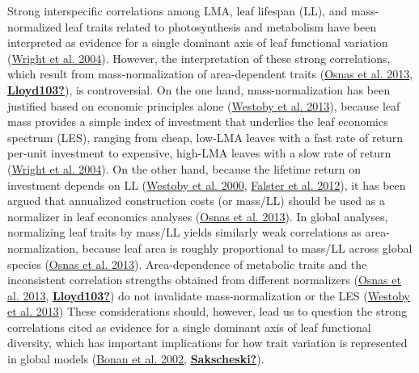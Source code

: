 \documentclass[
  12pt,
]{article}
\begin{document}
Strong interspecific correlations among LMA, leaf lifespan (LL), and mass-normalized leaf traits related to photosynthesis and metabolism have been interpreted as evidence for a single dominant axis of leaf functional variation (\protect\hyperlink{ref-Wright2004a}{Wright et al. 2004}).
However, the interpretation of these strong correlations, which result from mass-normalization of area-dependent traits (\protect\hyperlink{ref-Osnas2013}{Osnas et al. 2013}, \protect\hyperlink{ref-Lloyd103}{\textbf{Lloyd103?}}), is controversial.
On the one hand, mass-normalization has been justified based on economic principles alone (\protect\hyperlink{ref-Westoby2013}{Westoby et al. 2013}), because leaf mass provides a simple index of investment that underlies the leaf economics spectrum (LES), ranging from cheap, low-LMA leaves with a fast rate of return per-unit investment to expensive, high-LMA leaves with a slow rate of return (\protect\hyperlink{ref-Wright2004a}{Wright et al. 2004}).
On the other hand, because the lifetime return on investment depends on LL (\protect\hyperlink{ref-Westoby2000}{Westoby et al. 2000}, \protect\hyperlink{ref-Falster2012}{Falster et al. 2012}), it has been argued that annualized construction costs (or mass/LL) should be used as a normalizer in leaf economics analyses (\protect\hyperlink{ref-Osnas2013}{Osnas et al. 2013}).
In global analyses, normalizing leaf traits by mass/LL yields similarly weak correlations as area-normalization, because leaf area is roughly proportional to mass/LL across global species (\protect\hyperlink{ref-Osnas2013}{Osnas et al. 2013}).
Area-dependence of metabolic traits and the inconsistent correlation strengths obtained from different normalizers (\protect\hyperlink{ref-Osnas2013}{Osnas et al. 2013}, \protect\hyperlink{ref-Lloyd103}{\textbf{Lloyd103?}}) do not invalidate mass-normalization or the LES (\protect\hyperlink{ref-Westoby2013}{Westoby et al. 2013})
These considerations should, however, lead us to question the strong correlations cited as evidence for a single dominant axis of leaf functional diversity, which has important implications for how trait variation is represented in global models (\protect\hyperlink{ref-Bonan2002}{Bonan et al. 2002}, \protect\hyperlink{ref-Sakscheski}{\textbf{Sakscheski?}}).
\end{document}
